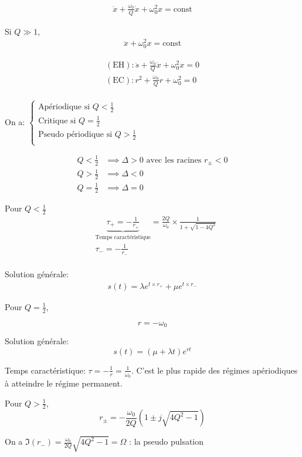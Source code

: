\documentclass[a4paper]{report}
\begin{document}
	\begin{align*}
		\ddot{x} + \frac{\omega_0}{Q} \dot{x} + \omega_0^2 x = \text{const}
	\end{align*}

	Si $Q\gg 1$,
	\begin{align*}
		\ddot{x} + \omega_0^2 x = \text{const}
	\end{align*}

	\begin{align*}
		(\text{EH}): \ddot{s} + \frac{\omega_0}{Q} \dot{x} + \omega_0^2 x = 0\\
		(\text{EC}): r^2 + \frac{\omega_0}{Q} r + \omega_0^2 = 0\\
	\end{align*}

	On a: $
		\begin{cases}
			\text{Apériodique si } Q < \frac{1}{2}\\
			\text{Critique si } Q = \frac{1}{2}\\
			\text{Pseudo périodique si } Q > \frac{1}{2}\\
		\end{cases}
	$

	\begin{align*}
		Q < \frac{1}{2} &\implies \Delta > 0 \text{ avec les racines } r_{\pm} < 0\\
		Q > \frac{1}{2} &\implies \Delta < 0\\
		Q = \frac{1}{2} &\implies \Delta = 0
	\end{align*}

	Pour $Q < \frac{1}{2}$
	\begin{align*}
		&\underbrace{\tau_{+} = -\frac{1}{r_+}}_\text{Temps caractéristique}
		= \frac{2Q}{\omega_0} \times \frac{1}{1+\sqrt{1-4Q^2} }
		\\
		&\tau_{-} = -\frac{1}{r_-}\\
	\end{align*}

	Solution générale:
	\begin{align*}
		s(t) = \lambda e^{t \times r_+} + \mu e^{t \times r_-}
	\end{align*}

	Pour $Q = \frac{1}{2}$,

	\[
	r = -\omega_0
	\] 

	Solution générale: \[
	s(t) = (\mu + \lambda t)e^{rt}
	\] 

	Temps caractéristique: $\tau = -\frac{1}{r} = \frac{1}{\omega_0}$. C'est le plus rapide des régimes apériodiques à atteindre le régime permanent.
	

	Pour $Q > \frac{1}{2}$,  \[
	r_\pm = -\frac{\omega_0}{2Q}\left( 1 \pm j\sqrt{4Q^2-1} \right)
	\]

	On a $\Im(r_-) = \frac{\omega_0}{2Q} \sqrt{4Q^2 - 1} = \Omega$ : la pseudo pulsation
\end{document}
